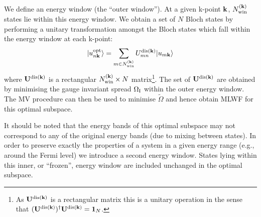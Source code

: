 We define an energy window (the ``outer window''). At a given
k-point $\bf{k}$, $N^{({\bf k})}_{{\rm win}}$ states lie within this
energy window. We obtain a set of $N$ Bloch states by
performing a unitary transformation amongst the Bloch states which
fall within the energy window at each k-point:
 \begin{equation}
| u_{n{\bf k}}^{{\rm opt}}\rangle = \sum_{m\in N^{({\bf k})}_{{\rm win}}}
U^{{\rm dis}({\bf k})}_{mn} | u_{m{\bf k}}\rangle
\end{equation}
where $\bf{U}^{{\rm dis}({\bf k})}$ is a rectangular $N^{({\bf k})}_{{\rm win}} \times N$
 matrix\footnote{As ${\bf U}^{{\rm dis}({\bf k})}$ is a rectangular
 matrix this is a unitary operation in the sense that $({\bf U}^{{\rm
 dis}({\bf k})})^{\dagger}{\bf U}^{{\rm dis}({\bf k})}={\bf 1}_N$.}. The
 set of $\bf{U}^{{\rm dis}({\bf k})}$ are obtained by minimising
 the gauge invariant spread $\Omega_{{\rm I}}$ within the outer energy
 window. The MV procedure can then be used to minimise $\tilde{\Omega}$
 and hence obtain MLWF for this optimal subspace.

It should be noted that the energy bands of this optimal subspace may
not correspond to any of the original energy bands (due to mixing
between states). In order to preserve exactly the properties of a
system in a given energy range (e.g., around the Fermi level) we
introduce a second  energy window. States lying within this inner, or
``frozen'', energy window are included unchanged in the optimal
subspace.
